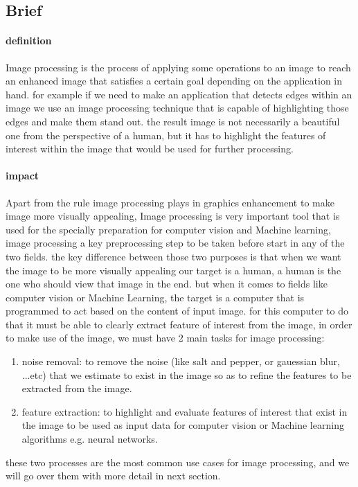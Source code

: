 \subsection{Brief}
\paragraph{definition}
Image processing is the process of applying some operations to an image to reach an enhanced image
that satisfies a certain goal depending on the application in hand.
for example if we need to make an application that detects edges within an image we use an image processing
technique that is capable of highlighting those edges and make them stand out.
the result image is not necessarily a beautiful one from the perspective of a human, but it has to highlight
the features of interest within the image that would be used for further processing.

\paragraph{impact}
Apart from the rule image processing plays in graphics enhancement to make image more visually appealing,
Image processing is very important tool that is used for the specially preparation for computer vision and Machine learning, image processing a key preprocessing step to be taken before start in any of the two fields.
the key difference between those two purposes is that when we want the image to be more visually appealing
our target is a human, a human is the one who should view that image in the end.
but when it comes to fields like computer vision or Machine Learning, the target is a computer that is programmed 
to act based on the content of input image.
for this computer to do that it must be able to clearly extract feature of interest from the image, 
in order to make use of the image, we must have 2 main tasks for image processing:
\begin{enumerate}
	\item noise removal: to remove the noise (like salt and pepper, or gauessian blur, ...etc) that we estimate to exist in the image so as to refine the features to be extracted from the image.
	
	\item feature extraction: to highlight and evaluate features of interest that exist in the image to be used
	as input data for computer vision or Machine learning algorithms e.g. neural networks.
\end{enumerate}
these two processes are the most common use cases for image processing, and we will go over them with more detail in next section.


